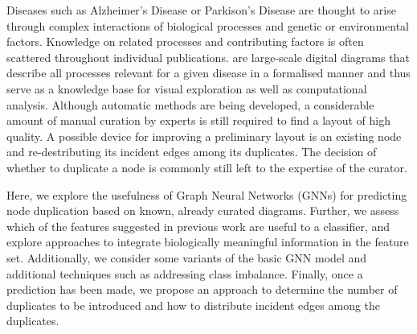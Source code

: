 \documentclass[
	fontsize=10pt, %
	twoside=false, %
	secnumdepth=1, %
  toc=indentunnumbered %
]{kaobook}
\begin{document}
Diseases such as Alzheimer's Disease or Parkison's Disease are thought to arise
through complex interactions of biological processes and genetic or
environmental factors.
Knowledge on related processes and contributing factors
is often scattered throughout individual publications.
%
 are large-scale digital diagrams that describe all processes
relevant for a given disease in a formalised manner and thus serve as a
knowledge base for visual exploration as well as computational analysis.
%
Although automatic methods are being developed, a considerable amount of manual
curation by experts is still required to find a layout of high quality.
A possible device for improving a preliminary layout is  an
existing node and re-destributing its incident edges among its duplicates.
The decision of whether to duplicate a node is commonly still left to the
expertise of the curator.

Here, we explore the usefulness of Graph Neural Networks (GNNs) for predicting node
duplication based on known, already curated diagrams.
%
Further, we assess which
of the features suggested in previous work
\cite{nielsen_MachineLearningSupport_2019} are useful to a classifier,
%
and explore approaches to integrate biologically meaningful information in the
feature set.
%
Additionally, we consider some variants of the basic GNN model and
additional techniques such as addressing class imbalance.
%
Finally, once a prediction has been made, we propose an approach to determine
the number of duplicates to be introduced and how to distribute incident edges
among the duplicates.
\end{document}
